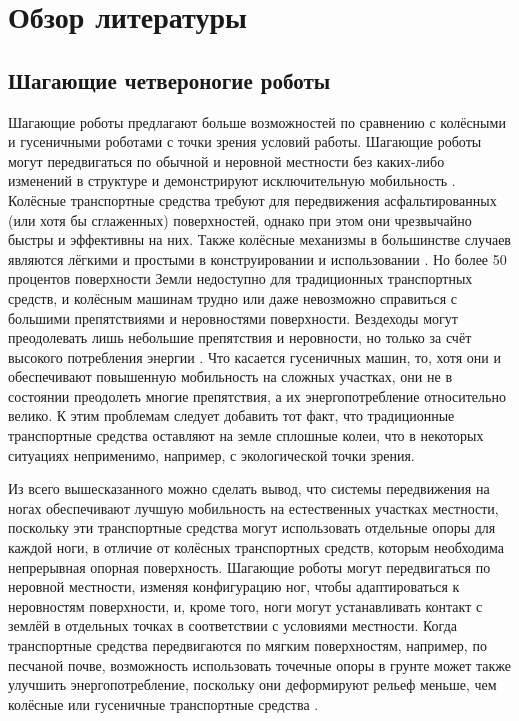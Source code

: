 \chapter{Обзор литературы}\label{ch:ch1}
\section{Шагающие четвероногие роботы}\label{sec:ch1/sec1}

Шагающие роботы предлагают больше возможностей по сравнению с колёсными и гусеничными роботами с точки зрения условий работы. Шагающие роботы могут передвигаться по обычной и неровной местности без каких-либо изменений в структуре и демонстрируют исключительную мобильность \cite{Silva2012}. Колёсные транспортные средства требуют для передвижения асфальтированных (или хотя бы сглаженных) поверхностей, однако при этом они чрезвычайно быстры и эффективны на них. Также колёсные механизмы в большинстве случаев являются лёгкими и простыми в конструировании и использовании \cite{Zen2006}. Но более 50 процентов поверхности Земли недоступно для традиционных транспортных средств, и колёсным машинам трудно или даже невозможно справиться с большими препятствиями и неровностями поверхности. Вездеходы могут преодолевать лишь небольшие препятствия и неровности, но только за счёт высокого потребления энергии \cite{Bekker1962}. Что касается гусеничных машин, то, хотя они и обеспечивают повышенную мобильность на сложных участках, они не в состоянии преодолеть многие препятствия, а их энергопотребление относительно велико. К этим проблемам следует добавить тот факт, что традиционные транспортные средства оставляют на земле сплошные колеи, что в некоторых ситуациях неприменимо, например, с экологической точки зрения. 

Из всего вышесказанного можно сделать вывод, что системы передвижения на ногах обеспечивают лучшую мобильность на естественных участках местности, поскольку эти транспортные средства могут использовать отдельные опоры для каждой ноги, в отличие от колёсных транспортных средств, которым необходима непрерывная опорная поверхность. Шагающие роботы могут передвигаться по неровной местности, изменяя конфигурацию ног, чтобы адаптироваться к неровностям поверхности, и, кроме того, ноги могут устанавливать контакт с землёй в отдельных точках в соответствии с условиями местности. Когда транспортные средства передвигаются по мягким поверхностям, например, по песчаной почве, возможность использовать точечные опоры в грунте может также улучшить энергопотребление, поскольку они деформируют рельеф меньше, чем колёсные или гусеничные транспортные средства \cite{Iida2007}. 

